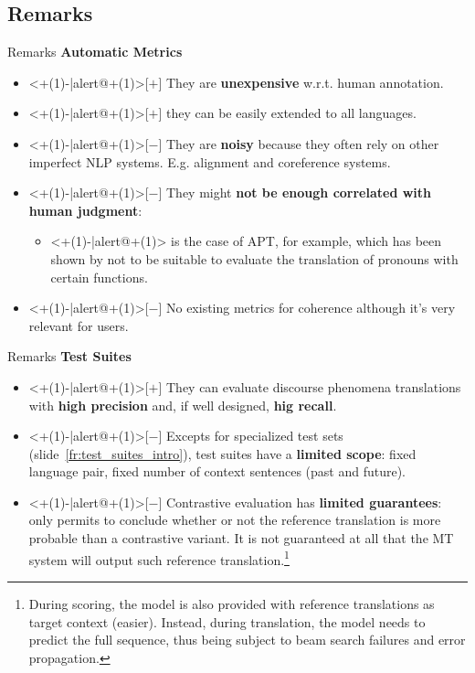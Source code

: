 
\subsection{Remarks}

\begin{frame}{Remarks}
	\textbf{Automatic Metrics}
	\begin{itemize}
		\item<+(1)-|alert@+(1)>[$+$] They are \textbf{unexpensive} w.r.t. human annotation.
		\item<+(1)-|alert@+(1)>[$+$] they can be easily extended to all languages.
		\item<+(1)-|alert@+(1)>[$-$] They are \textbf{noisy} because they often rely on other imperfect NLP systems. E.g. alignment and coreference systems.
		\item<+(1)-|alert@+(1)>[$-$] They might \textbf{not be enough correlated with human judgment}:
		\begin{itemize}
			\item<+(1)-|alert@+(1)> is the case of APT, for example, which has been shown by \cite{guillou_automatic_2018} not to be suitable to evaluate the translation of pronouns with certain functions.
		\end{itemize}
		\item<+(1)-|alert@+(1)>[$-$] No existing metrics for coherence although it's very relevant for users.
	\end{itemize}
\end{frame}

\begin{frame}{Remarks}
	\textbf{Test Suites}
	\begin{itemize}
		\item<+(1)-|alert@+(1)>[$+$] They can evaluate discourse phenomena translations with \textbf{high precision} and, if well designed, \textbf{hig recall}.
		\item<+(1)-|alert@+(1)>[$-$] Excepts for specialized test sets (slide~\ref{fr:test_suites_intro}), test suites have a \textbf{limited scope}: fixed language pair, fixed number of context sentences (past and future). 
		\item<+(1)-|alert@+(1)>[$-$] Contrastive evaluation has \textbf{limited guarantees}: only permits to conclude whether or not the reference translation is more probable than a contrastive variant. It is not guaranteed at all that the MT system will output such reference translation.\footnote{During scoring, the model is also provided with reference translations as target context (easier). Instead, during translation, the model needs to predict the full sequence, thus being subject to beam search failures and error propagation.} 
	\end{itemize}
\end{frame}

